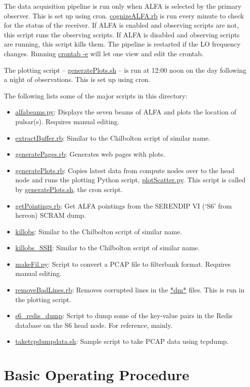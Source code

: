 \documentclass{article}
\begin{document}
The data acquisition pipeline is run only when ALFA is selected by the primary
observer. This is set up using cron. \url{cognizeALFA.rb} is run every minute
to check for the status of the receiver. If ALFA is enabled and observing
scripts are not, this script runs the observing scripts. If ALFA is disabled
and observing scripts are running, this script kills them. The pipeline is
restarted if the LO frequency changes. Running \url{crontab -e} will let one
view and edit the crontab.

The plotting script -- \url{generatePlots.sh} -- is run at 12:00 noon on the
day following a night of observations. This is set up using cron.

The following lists some of the major scripts in this directory:

\begin{itemize}
\item \url{alfabeams.py}: Displays the seven beams of ALFA and plots the
location of pulsar(s). Requires manual editing.
\item \url{extractBuffer.rb}: Similar to the Chilbolton script of similar name.
\item \url{generatePages.rb}: Generates web pages with plots.
\item \url{generatePlots.rb}: Copies latest data from compute nodes over to the
head node and runs the plotting Python script, \url{plotScatter.py}. This
script is called by \url{generatePlots.sh}, the cron script.
\item \url{getPointings.rb}: Get ALFA pointings from the SERENDIP VI (`S6' from
hereon) SCRAM dump.
\item \url{killobs}: Similar to the Chilbolton script of similar name.
\item \url{killobs_SSH}: Similar to the Chilbolton script of similar name.
\item \url{makeFil.py}: Script to convert a PCAP file to filterbank format.
Requires manual editing.
\item \url{removeBadLines.rb}: Removes corrupted lines in the \url{*dm*} files.
This is run in the plotting script.
\item \url{s6_redis_dump}: Script to dump some of the key-value pairs in the
Redis database on the S6 head node. For reference, mainly.
\item \url{taketcpdumpdata.sh}: Sample script to take PCAP data using tcpdump.
\end{itemize}


\section{Basic Operating Procedure}
\end{document}

